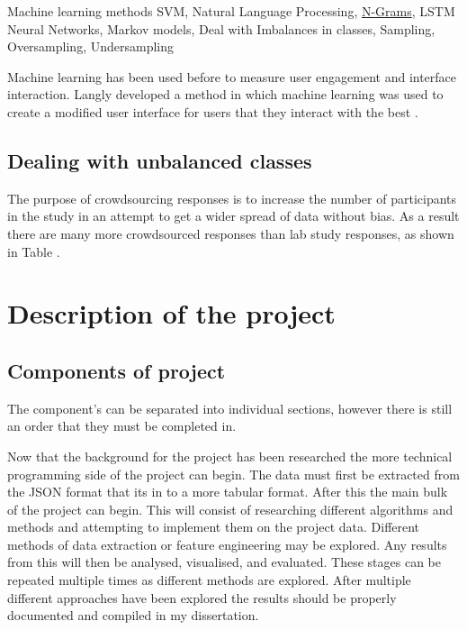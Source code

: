\documentclass{article}
\begin{document}
Machine learning methods
    SVM,
    Natural Language Processing,
    \underline{N-Grams},
    LSTM Neural Networks,
    Markov models,
Deal with Imbalances in classes,
    Sampling,
    Oversampling, Undersampling

Machine learning has been used before to measure user engagement and interface interaction.
Langly developed a method in which machine learning was used to create a modified user interface for users that they interact with the best \cite{langley1997machine}.


\subsection{Dealing with unbalanced classes}

The purpose of crowdsourcing responses is to increase the number of participants in the study in an attempt to get a wider spread of data without bias.
As a result there are many more crowdsourced responses than lab study responses, as shown in Table .

\section{Description of the project}

\subsection{Components of project}

The component's can be separated into individual sections, however there is still an order that they must be completed in.

Now that the background for the project has been researched the more technical programming side of the project can begin.
The data must first be extracted from the JSON format that its in to a more tabular format.
After this the main bulk of the project can begin.
This will consist of researching different algorithms and methods and attempting to implement them on the project data.
Different methods of data extraction or feature engineering may be explored.
Any results from this will then be analysed, visualised, and evaluated.
These stages can be repeated multiple times as different methods are explored.
After multiple different approaches have been explored the results should be properly documented and compiled in my dissertation.

\end{document}

